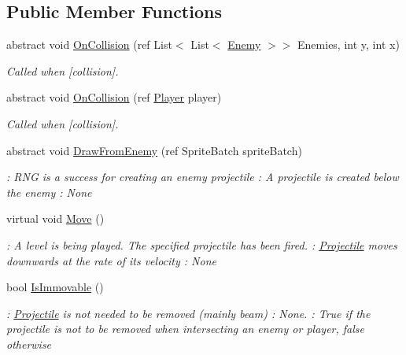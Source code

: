 \subsection*{Public Member Functions}
\begin{DoxyCompactItemize}
\item 
abstract void \hyperlink{classXaria_1_1Projectile_a9c2185ee6c1cf40e1cf846aa196ba514}{On\+Collision} (ref List$<$ List$<$ \hyperlink{classXaria_1_1Enemy}{Enemy} $>$$>$ Enemies, int y, int x)
\begin{DoxyCompactList}\small\item\em Called when \mbox{[}collision\mbox{]}. \end{DoxyCompactList}\item 
abstract void \hyperlink{classXaria_1_1Projectile_a57ef6f4c3545ab6f1346b36949dcd3d8}{On\+Collision} (ref \hyperlink{classXaria_1_1Player}{Player} player)
\begin{DoxyCompactList}\small\item\em Called when \mbox{[}collision\mbox{]}. \end{DoxyCompactList}\item 
abstract void \hyperlink{classXaria_1_1Projectile_a92b00c404863fc5ef875fb598345bcbc}{Draw\+From\+Enemy} (ref Sprite\+Batch sprite\+Batch)
\begin{DoxyCompactList}\small\item\em \+: R\+NG is a success for creating an enemy projectile \+: A projectile is created below the enemy \+: None \end{DoxyCompactList}\item 
virtual void \hyperlink{classXaria_1_1Projectile_a7ac9f22571f1bb0059e684f1cb755559}{Move} ()
\begin{DoxyCompactList}\small\item\em \+: A level is being played. The specified projectile has been fired. \+: \hyperlink{classXaria_1_1Projectile}{Projectile} moves downwards at the rate of its velocity \+: None \end{DoxyCompactList}\item 
bool \hyperlink{classXaria_1_1Projectile_a00177398f98fba5aad8e9b4a0cb02e0c}{Is\+Immovable} ()
\begin{DoxyCompactList}\small\item\em \+: \hyperlink{classXaria_1_1Projectile}{Projectile} is not needed to be removed (mainly beam) \+: None. \+: True if the projectile is not to be removed when intersecting an enemy or player, false otherwise \end{DoxyCompactList}\end{DoxyCompactItemize}
